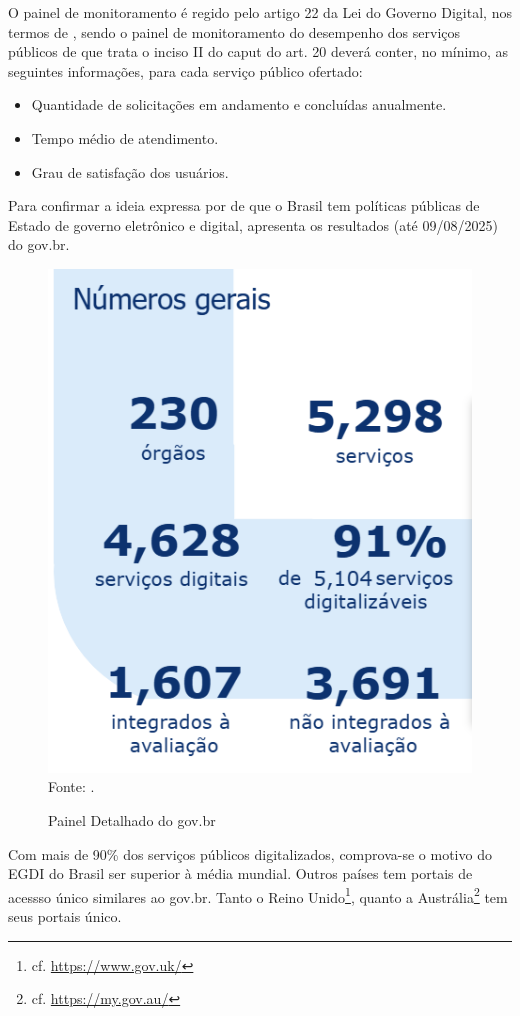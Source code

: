 O painel de monitoramento é regido pelo artigo 22 da Lei do Governo Digital, nos termos de \cite{l14129}, sendo o painel de monitoramento do desempenho dos serviços públicos de que trata o inciso II do caput do art. 20 deverá conter, no mínimo, as seguintes informações, para cada serviço público ofertado:

\begin{itemize}
    \item Quantidade de solicitações em andamento e concluídas anualmente.
    \item Tempo médio de atendimento.
    \item Grau de satisfação dos usuários.
\end{itemize}

Para confirmar a ideia expressa por \cite{mitkiewicz2024transformaccao} de que o Brasil tem políticas públicas de Estado de governo eletrônico e digital, \cite{painel_completo_monitoramento_govbr} apresenta os resultados (até 09/08/2025) do gov.br.

\begin{figure}[H]
    \centering
    \caption{Painel Detalhado do gov.br}
    \includegraphics[width=0.5\linewidth]{figuras/painel_govbr.PNG}
    \label{fig:painel_govbr}
    \\ \footnotesize{Fonte: \cite{painel_completo_monitoramento_govbr}.}
\end{figure}

Com mais de 90\% dos serviços públicos digitalizados, comprova-se o motivo do EGDI do Brasil ser superior à média mundial. Outros países tem portais de acessso único similares ao gov.br. Tanto o Reino Unido\footnote{cf. \url{https://www.gov.uk/}}, quanto a Austrália\footnote{cf. \url{https://my.gov.au/}} tem seus portais único.

